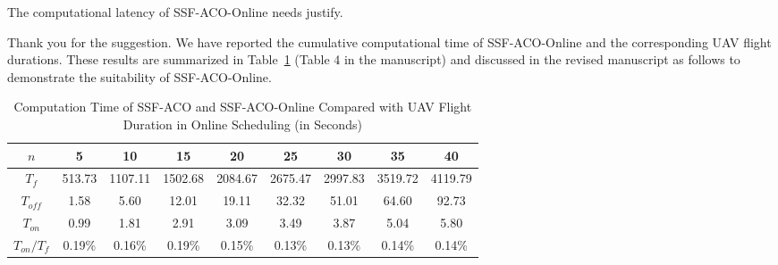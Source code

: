 \reviewer

\begin{revcomment} %
	The computational latency of SSF-ACO-Online needs justify.
\end{revcomment}
\begin{revresponse}
	Thank you for the suggestion.
	We have reported the cumulative computational time of SSF-ACO-Online and the corresponding UAV flight durations.
	These results are summarized in Table~\ref{tb:runtime} (Table 4 in the manuscript) and discussed in the revised manuscript as follows to demonstrate the suitability of SSF-ACO-Online.

	\begin{table}[h]
		\renewcommand{\arraystretch}{1.2}
		\centering
		\caption{Computation Time of SSF-ACO and SSF-ACO-Online Compared with UAV Flight Duration in Online Scheduling (in Seconds)}
		\label{tb:runtime}
		\centering
		\begin{tabular}{*{9}{c}}
			\hline
			$n$ & 5 & 10 & 15 & 20 & 25 & 30 & 35 & 40 \\
			\hline
			$T_f$ & 513.73 & 1107.11 & 1502.68 & 2084.67 & 2675.47 & 2997.83 & 3519.72 & 4119.79 \\
			$T_{off}$ & 1.58 & 5.60 & 12.01 & 19.11 & 32.32 & 51.01 & 64.60 & 92.73 \\
			$T_{on}$ & 0.99 & 1.81 & 2.91 & 3.09 & 3.49 & 3.87 & 5.04 & 5.80 \\
			$T_{on} / T_f$ & 0.19\% & 0.16\% & 0.19\% & 0.15\% & 0.13\% & 0.13\% & 0.14\% & 0.14\% \\
			\hline
		\end{tabular}
	\end{table}


\end{revresponse}
